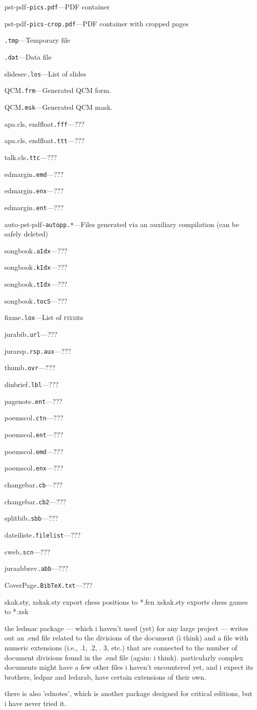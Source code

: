 \documentclass{article}
\newcommand\ext[1]{\texttt{#1}}
\newcommand\EXT[3]{\noindent #1\quad\ext{#2}\quad---\quad#3\par}
\begin{document}
\EXT{pst-pdf}{-pics.pdf}{PDF container}
\EXT{pst-pdf}{-pics-crop.pdf}{PDF container with cropped pages}

\EXT{}{.tmp}{Temporary file}
\EXT{}{.dat}{Data file}

\EXT{slidesec}{.los}{List of slides}

\EXT{QCM}{.frm}{Generated QCM form.}
\EXT{QCM}{.msk}{Generated QCM mask.}

\EXT{apa.cls, endfloat}{.fff}{???}
\EXT{apa.cls, endfloat}{.ttt}{???}
\EXT{talk.cls}{.ttc}{???}
\EXT{edmargin}{.emd}{???}
\EXT{edmargin}{.enx}{???}
\EXT{edmargin}{.ent}{???}
\EXT{auto-pst-pdf}{-autopp.*}{Files generated via an auxiliary compilation (can be safely deleted)}
\EXT{songbook}{.aIdx}{???}
\EXT{songbook}{.kIdx}{???}
\EXT{songbook}{.tIdx}{???}
\EXT{songbook}{.tocS}{???}
\EXT{fixme}{.lox}{List of \textsc{fixme}s}
\EXT{jurabib}{.url}{???}
\EXT{jurarsp}{.rsp.aux}{???}
\EXT{thumb}{.ovr}{???}
\EXT{dinbrief}{.lbl}{???}
\EXT{pagenote}{.ent}{???}
\EXT{poemscol}{.ctn}{???}
\EXT{poemscol}{.ent}{???}
\EXT{poemscol}{.emd}{???}
\EXT{poemscol}{.enx}{???}
\EXT{changebar}{.cb}{???}
\EXT{changebar}{.cb2}{???}
\EXT{splitbib}{.sbb}{???}
\EXT{dateiliste}{.filelist}{???}
\EXT{cweb}{.scn}{???}
\EXT{juraabbrev}{.abb}{???}
\EXT{CoverPage}{.BibTeX.txt}{???}

skak.sty, xskak.sty  export chess positions to *.fen
xskak.sty exports chess games to *.xsk

the ledmac package --- which i haven't used (yet) for any large
project --- writes out an .end file related to the divisions of the
document (i think) and a file with numeric extensions (i.e., .1, .2, .
3, etc.) that are connected to the number of document divisions found
in the .end file (again: i think).  particularly complex documents
might have a few other files i haven't encountered yet, and i expect
its brothers, ledpar and ledarab, have certain extensions of their
own.

there is also 'ednotes', which is another package designed for
critical editions, but i have never tried it.
\end{document}
